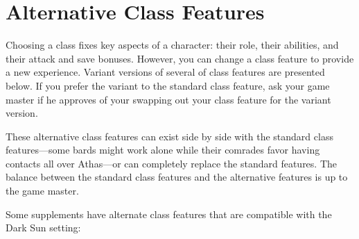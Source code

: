 \section{Alternative Class Features}
Choosing a class fixes key aspects of a character: their role, their abilities, and their attack and save bonuses. However, you can change a class feature to provide a new experience. Variant versions of several of class features are presented below. If you prefer the variant to the standard class feature, ask your game master if he approves of your swapping out your class feature for the variant version.

These alternative class features can exist side by side with the standard class features---some bards might work alone while their comrades favor having contacts all over Athas---or can completely replace the standard features. The balance between the standard class features and the alternative features is up to the game master.

Some supplements have alternate class features that are compatible with the {\tableheader Dark Sun} setting:


